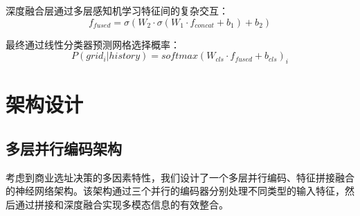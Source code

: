 \documentclass{article}
\begin{document}
深度融合层通过多层感知机学习特征间的复杂交互：
\begin{equation}
f_{fused} = \sigma(W_2 \cdot \sigma(W_1 \cdot f_{concat} + b_1) + b_2)
\end{equation}

最终通过线性分类器预测网格选择概率：
\begin{equation}
P(grid_i | history) = softmax(W_{cls} \cdot f_{fused} + b_{cls})_i
\end{equation}

\section{架构设计}
\subsection{多层并行编码架构}
考虑到商业选址决策的多因素特性，我们设计了一个多层并行编码、特征拼接融合的神经网络架构。该架构通过三个并行的编码器分别处理不同类型的输入特征，然后通过拼接和深度融合实现多模态信息的有效整合。
\end{document}
